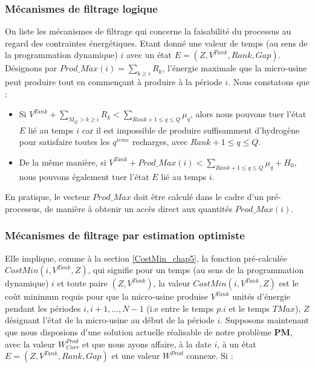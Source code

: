 \subsubsection{Mécanismes de filtrage logique}

On liste les mécanismes de filtrage qui concerne la faisabilité du processus au regard des contraintes énergétiques. Etant donné une valeur de temps (au sens de la programmation dynamique) $i$ avec un état $E = (Z, V^{Tank} , Rank, Gap)$. Désignons par $Prod\_Max(i) = \sum_{k \geq i} R_k$, l'énergie maximale que la micro-usine peut produire tout en commençant à produire à la période $i$. Nous constatons que :
\begin{itemize}[label=$\square$]%
	\item	Si $V^{Tank} +  \sum_{M_Q>k\geq i}R_k< \sum_{Rank+1 \leq q \leq Q} \mu_q$, alors nous pouvons tuer l'état $E$ lié au temps $i$ car il est impossible de produire suffisamment d'hydrogène pour satisfaire toutes les $q^{ieme}$ recharges, avec $Rank+1 \leq q \leq Q$.
	
	\item	De la même manière, si $V^{Tank} + Prod\_Max(i) < \sum_{Rank+1 \leq q \leq Q} \mu_q + H_0$, nous pouvons également tuer l'état $E$ lié au temps $i$.
\end{itemize}

En pratique, le vecteur $Prod\_Max$ doit être calculé dans le cadre d'un pré-processus, de manière à obtenir un accès direct aux quantités $Prod\_Max(i)$.



\subsubsection{Mécanismes de filtrage par estimation optimiste}


Elle implique, comme à la section \ref{CostMin_chap5}, la fonction pré-calculée $CostMin(i, V^{Tank}, Z)$, qui signifie pour un temps (au sens de la programmation dynamique) $i$ et toute paire $(Z, V^{Tank})$, la valeur $CostMin(i, V^{Tank}, Z)$ est le coût minimum requis pour que la micro-usine produise $V^{Tank}$ unités d'énergie pendant les périodes $i, i+1, \dots, N-1$ (i.e entre le temps $p.i$ et le temps $TMax$), $Z$ désignant l'état de la micro-usine au début de la période $i$.
Supposons maintenant que nous disposions d'une solution actuelle réalisable de notre problème \textbf{PM}, avec la valeur $W^{Prod}_{Curr}$ et que nous ayons affaire, à la date $i$, à un état $E = (Z, V^{Tank} , Rank, Gap)$ et une valeur $ W^{Prod}$ connexe. 
Si :

